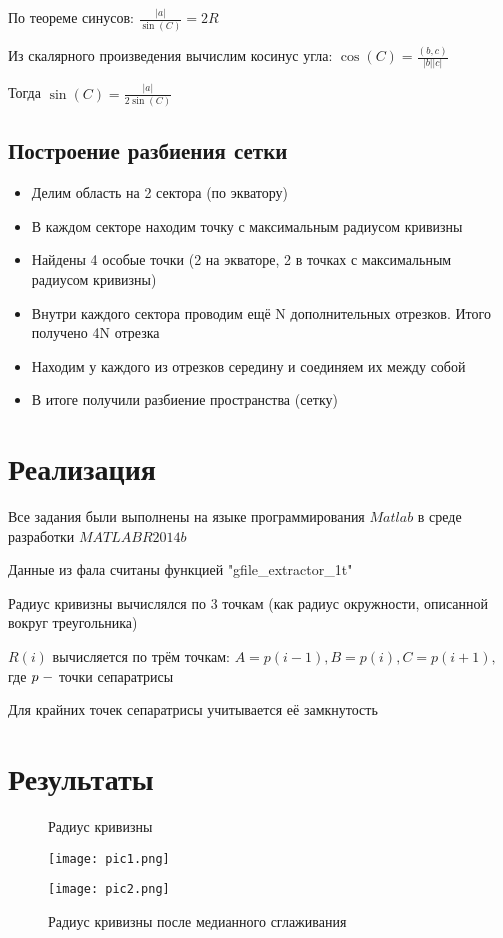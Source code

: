 \documentclass[a4]{article}
\begin{document}
По теореме синусов: $\frac{\vert a\vert}{\sin(C)}=2R$

Из скалярного произведения вычислим косинус угла: $ \cos(C)=\frac{(b,c)}{\vert b\vert \vert c\vert}$

Тогда $\sin(C)=\frac{\vert a\vert}{2\sin(C)}$

\subsection{Построение разбиения сетки}
\begin{itemize}
    \item Делим область на 2 сектора (по экватору)

\item В каждом секторе находим точку с максимальным радиусом кривизны

\item Найдены 4 особые точки (2 на экваторе, 2 в точках с максимальным радиусом кривизны)

\item Внутри каждого сектора проводим ещё N дополнительных отрезков. Итого получено 4N отрезка

\item Находим у каждого из отрезков середину и соединяем их между собой

\item В итоге получили разбиение пространства (сетку)
\end{itemize}

\section{Реализация}
Все задания были выполнены на языке программирования $Matlab$ в среде разработки $MATLAB R2014b$ \hfill \cite{1}

Данные из фала считаны функцией "gfile\_extractor\_1t" \hfill\cite{2}

Радиус кривизны вычислялся по $3$ точкам (как радиус окружности, описанной вокруг треугольника)

$R(i)$ вычисляется по трём точкам: $A = p(i-1), B = p(i), C = p(i+1),$ где $p\;\--$ точки сепаратрисы

Для крайних точек сепаратрисы учитывается её замкнутость


\section{Результаты}

\begin{figure}[H]
\begin{center}
\caption{Радиус кривизны }
\texttt{[image: pic1.png]} 

\caption{Радиус кривизны после медианного сглаживания}
\texttt{[image: pic2.png]} 
\end{center}
\end{figure}
\end{document}
